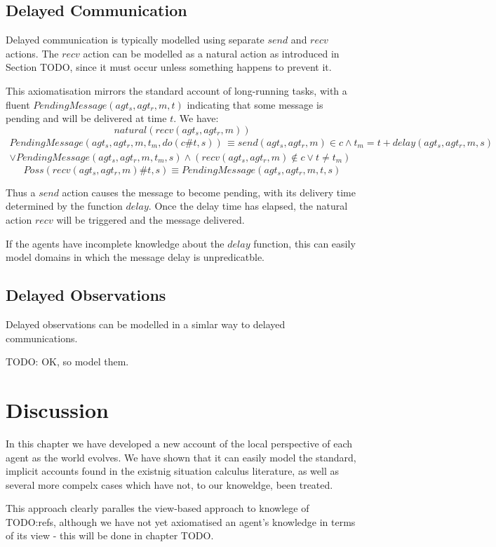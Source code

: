 \subsection{Delayed Communication}

Delayed communication is typically modelled using separate $send$
and $recv$ actions. The $recv$ action can be modelled as a natural
action as introduced in Section TODO, since it must occur unless something
happens to prevent it.

This axiomatisation mirrors the standard account of long-running tasks,
with a fluent $PendingMessage(agt_{s},agt_{r},m,t)$ indicating that
some message is pending and will be delivered at time $t$. We have:\[
natural(recv(agt_{s},agt_{r},m))\]
 \begin{multline*}
PendingMessage(agt_{s},agt_{r},m,t_{m},do(c\#t,s))\,\equiv send(agt_{s},agt_{r},m)\in c\wedge t_{m}=t+delay(agt_{s},agt_{r},m,s)\\
\vee PendingMessage(agt_{s},agt_{r},m,t_{m},s)\wedge\left(recv(agt_{s},agt_{r},m)\not\in c\vee t\neq t_{m}\right)\end{multline*}
 \[
Poss(recv(agt_{s},agt_{r},m)\#t,s)\equiv PendingMessage(agt_{s},agt_{r},m,t,s)\]


Thus a $send$ action causes the message to become pending, with its
delivery time determined by the function $delay$. Once the delay
time has elapsed, the natural action $recv$ will be triggered and
the message delivered.

If the agents have incomplete knowledge about the $delay$ function,
this can easily model domains in which the message delay is unpredicatble.


\subsection{Delayed Observations}

Delayed observations can be modelled in a simlar way to delayed communications.

TODO: OK, so model them.


\section{Discussion}

In this chapter we have developed a new account of the local perspective
of each agent as the world evolves. We have shown that it can easily
model the standard, implicit accounts found in the existnig situation
calculus literature, as well as several more compelx cases which have
not, to our knoweldge, been treated.

This approach clearly paralles the view-based approach to knowlege
of TODO:refs, although we have not yet axiomatised an agent's knowledge
in terms of its view - this will be done in chapter TODO.

